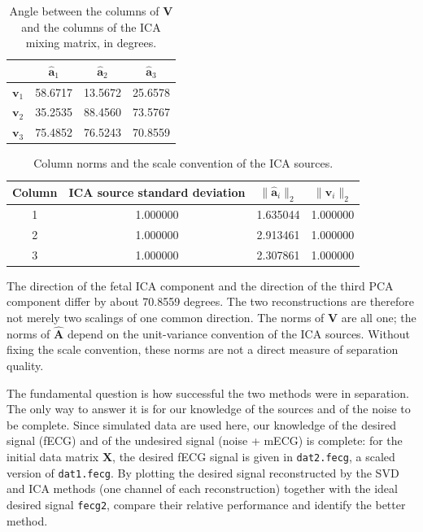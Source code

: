 \begin{table}[H]
\centering
\caption{Angle between the columns of $\mathbf{V}$ and the columns of the ICA mixing matrix, in degrees.}
\begin{tabular}{@{}cccc@{}}
\toprule
 & $\hat{\mathbf{a}}_1$ & $\hat{\mathbf{a}}_2$ & $\hat{\mathbf{a}}_3$\\
\midrule
$\mathbf{v}_1$ & 58.6717 & 13.5672 & 25.6578\\
$\mathbf{v}_2$ & 35.2535 & 88.4560 & 73.5767\\
$\mathbf{v}_3$ & 75.4852 & 76.5243 & 70.8559\\
\bottomrule
\end{tabular}
\end{table}

\begin{table}[H]
\centering
\caption{Column norms and the scale convention of the ICA sources.}
\begin{tabular}{@{}cccc@{}}
\toprule
\textbf{Column} & \textbf{ICA source standard deviation} & $\|\hat{\mathbf{a}}_i\|_2$ & $\|\mathbf{v}_i\|_2$\\
\midrule
1 & 1.000000 & 1.635044 & 1.000000\\
2 & 1.000000 & 2.913461 & 1.000000\\
3 & 1.000000 & 2.307861 & 1.000000\\
\bottomrule
\end{tabular}
\end{table}

The direction of the fetal ICA component and the direction of the third PCA component differ by about 70.8559 degrees. The two reconstructions are therefore not merely two scalings of one common direction. The norms of $\mathbf{V}$ are all one; the norms of $\widehat{\mathbf{A}}$ depend on the unit-variance convention of the ICA sources. Without fixing the scale convention, these norms are not a direct measure of separation quality.


\begin{taskbox}
The fundamental question is how successful the two methods were in separation. The only way to answer it is for our knowledge of the sources and of the noise to be complete. Since simulated data are used here, our knowledge of the desired signal (fECG) and of the undesired signal (noise + mECG) is complete: for the initial data matrix $\mathbf{X}$, the desired fECG signal is given in \texttt{dat2.fecg}, a scaled version of \texttt{dat1.fecg}. By plotting the desired signal reconstructed by the SVD and ICA methods (one channel of each reconstruction) together with the ideal desired signal \texttt{fecg2}, compare their relative performance and identify the better method.
\end{taskbox}

